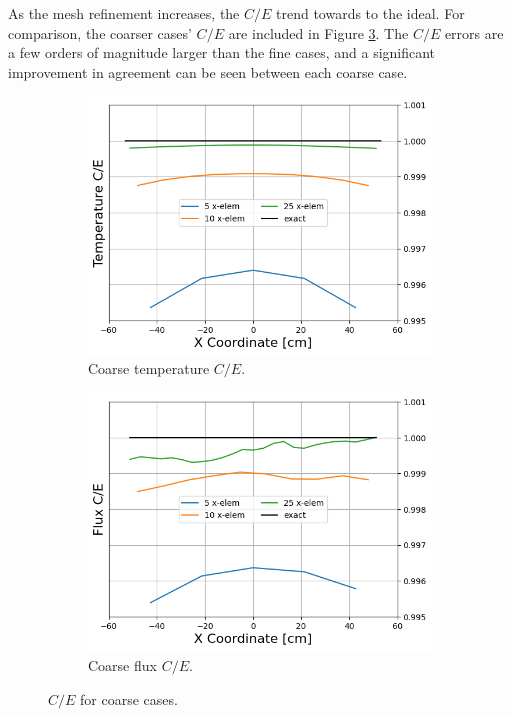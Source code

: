 \documentclass[letterpaper]{mc2023}
\begin{document}
As the mesh refinement increases, the $C/E$ trend towards to the ideal. For comparison, the coarser cases' $C/E$ are included in
Figure \ref{fig:coarse_ce}. The $C/E$ errors are a few orders of magnitude larger than the fine cases, and a significant improvement
in agreement can be seen between each coarse case.
\begin{figure}[H]
    \centering
    \begin{subfigure}{0.475\linewidth}
        \includegraphics[width=\linewidth]{figures/coarse_temp_num_to_analy_ratios.png}
        \caption{Coarse temperature $C/E$.}
        \label{fig:coarse_temp_ce}
    \end{subfigure}
    \begin{subfigure}{0.475\linewidth}
        \includegraphics[width=\linewidth]{figures/coarse_flux_num_to_analy_ratios.png}
        \caption{Coarse flux $C/E$.}
        \label{fig:coarse_flux_ce}
    \end{subfigure}
    \par\bigskip
    \caption{$C/E$ for coarse cases.}
    \label{fig:coarse_ce}
\end{figure}
\end{document}
